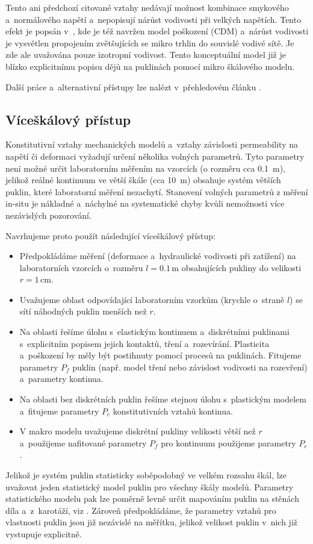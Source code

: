 \documentclass{article}
\def\unit#1{\mathrm{#1}}
\begin{document}
Tento ani předchozí citované vztahy nedávají možnost kombinace smykového a~normálového napětí a~nepopisují 
nárůst vodivosti při velkých napětích. Tento efekt je popsán v~\cite{Souley2001}, kde je též navržen model poškození (CDM)
a~nárůst vodivosti je vysvětlen propojením zvětšujících se mikro trhlin do souvislé vodivé sítě.
Je zde ale uvažována pouze izotropní vodivost. Tento konceptuální model již je blízko explicitnímu popisu dějů na puklinách 
pomocí mikro škálového modelu.

Další práce a~alternativní přístupy lze nalézt v~přehledovém článku \cite{Shahbazi2020a}. 




\subsection{Víceškálový přístup}
\label{sec:mikroskala}
Konstitutivní vztahy mechanických modelů a~vztahy závislosti permeability na napětí či deformaci vyžadují určení 
několika volných parametrů. Tyto parametry není možné určit laboratorním měřením na vzorcích (o rozměru cca 0.1~m), 
jelikož reálné kontinuum ve větší škále (cca 10~m) obsahuje systém větších puklin, které laboratorní měření nezachytí. 
Stanovení volných parametrů z měření in-situ je nákladné a~náchylné na systematické chyby kvůli nemožnosti 
více nezávislých pozorování. 


Navrhujeme proto použít následující víceškálový přístup:
\begin{itemize}
 \item Předpokládáme měření (deformace a~hydraulické vodivosti při zatížení) na laboratorních vzorcích o~rozměru $l=0.1\,\unit{m}$ obsahujících pukliny do velikosti $r=1\,\unit{cm}$.
 \item Uvažujeme oblast odpovídající laboratorním vzorkům (krychle o~straně $l$) se sítí náhodných puklin menších než $r$.
 \item Na oblasti řešíme úlohu s~elastickým kontinuem a~diskrétními puklinami s~explicitním popisem jejich kontaktů, tření a~rozevírání.
       Plasticita a~poškození by měly být postihnuty pomocí procesů na puklinách. Fitujeme parametry $P_f$ puklin (např. model tření nebo závislost vodivosti na rozevření) a~parametry kontinua. 
 \item Na oblasti bez diskrétních puklin řešíme stejnou úlohu s~plastickým modelem a~fitujeme parametry $P_c$ konstitutivních vztahů kontinua.
 \item V makro modelu uvažujeme diskrétní pukliny velikosti větší než $r$ a~použijeme nafitované parametry $P_f$ pro kontinuum použijeme parametry $P_c$.
\end{itemize}
Jelikož je systém puklin statisticky soběpodobný ve velkém rozsahu škál, lze uvažovat jeden statistický model puklin pro všechny škály modelů.
Parametry statistického modelu pak lze poměrně levně určit mapováním puklin na stěnách díla a~z~karotáží, viz \cite{Bonnet2001}.
Zároveň předpokládáme, že parametry vztahů pro vlastnosti puklin jsou již nezávislé na měřítku, 
jelikož velikost puklin v~nich již vystupuje explicitně. 
\end{document}
